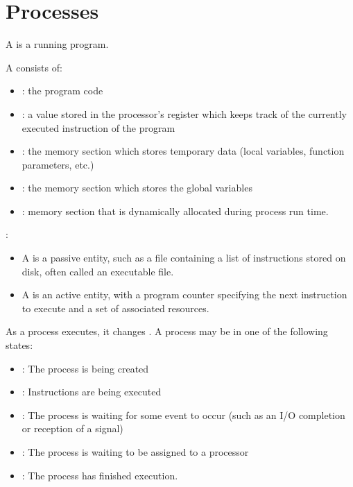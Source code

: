 \chapter{Processes}

    \par A  is a running program.
    \par A  consists of:
      \begin{itemize}
        \item {}: the program code
        \item {}: a value stored in the processor's register
          which keeps track of the currently executed instruction of the
          program
        \item {}: the memory section which stores temporary data (local
          variables, function parameters, etc.)
        \item {}: the memory section which stores the global
          variables
        \item {}: memory section that is dynamically allocated during
          process run time.
      \end{itemize}
    \par {}:
      \begin{itemize}
        \item A  is a passive entity, such as a file containing a
          list of instructions stored on disk, often called an executable file.
        \item A  is an active entity, with a program counter
          specifying the next instruction to execute and a set of associated
          resources.
      \end{itemize}
  
    \par As a process executes, it changes . A process may be in one
      of the following states:
      \begin{itemize}
        \item {}: The process is being created
        \item {}: Instructions are being executed
        \item {}: The process is waiting for some event to occur
          (such as an I/O completion or reception of a signal)
        \item {}: The process is waiting to be assigned to a processor
        \item {}: The process has finished execution.
      \end{itemize}

